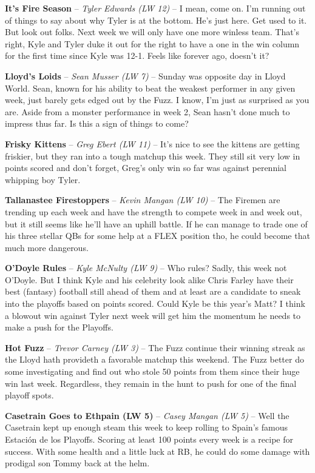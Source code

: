 \documentclass[11pt,letterpaper]{article}
\begin{document}
\newpage
{}
\begin{etaremune}
\item \textbf{It's Fire Season} -- \textit{Tyler Edwards (LW 12)} -- I mean, come on. I'm running out of things to say about why Tyler is at the bottom. He's just here. Get used to it. But look out folks. Next week we will only have one more winless team. That's right, Kyle and Tyler duke it out for the right to have a one in the win column for the first time since Kyle was 12-1. Feels like forever ago, doesn't it?
\item \textbf{Lloyd's Loids} -- \textit{Sean Musser (LW 7)} -- Sunday was opposite day in Lloyd World. Sean, known for his ability to beat the weakest performer in any given week, just barely gets edged out by the Fuzz. I know, I'm just as surprised as you are. Aside from a monster performance in week 2, Sean hasn't done much to impress thus far. Is this a sign of things to come?
\item \textbf{Frisky Kittens} -- \textit{Greg Ebert (LW 11)} -- It's nice to see the kittens are getting friskier, but they ran into a tough matchup this week. They still sit very low in points scored and don't forget, Greg's only win so far was against perennial whipping boy Tyler.  
\item \textbf{Tallanastee Firestoppers} -- \textit{Kevin Mangan (LW 10)} -- The Firemen are trending up each week and have the strength to compete week in and week out, but it still seems like he'll have an uphill battle. If he can manage to trade one of his three stellar QBs for some help at a FLEX position tho, he could become that much more dangerous. 
\item \textbf{O'Doyle Rules} -- \textit{Kyle McNulty (LW 9)} -- Who rules? Sadly, this week not O'Doyle. But I think Kyle and his celebrity look alike Chris Farley have their best (fantasy) football still ahead of them and at least are a candidate to sneak into the playoffs based on points scored. Could Kyle be this year's Matt? I think a blowout win against Tyler next week will get him the momentum he needs to make a push for the Playoffs. 
\item \textbf{Hot Fuzz} -- \textit{Trevor Carney (LW 3)} -- The Fuzz continue their winning streak as the Lloyd hath provideth a favorable matchup this weekend. The Fuzz better do some investigating and find out who stole 50 points from them since their huge win last week. Regardless, they remain in the hunt to push for one of the final playoff spots. 
\item \textbf{Casetrain Goes to Ethpain (LW 5)} -- \textit{Casey Mangan (LW 5)} -- Well the Casetrain kept up enough steam this week to keep rolling to Spain's famous Estaci\'{o}n de los Playoffs. Scoring at least 100 points every week is a recipe for success. With some health and a little luck at RB, he could do some damage with prodigal son Tommy back at the helm. 

\end{etaremune}
\end{document}
